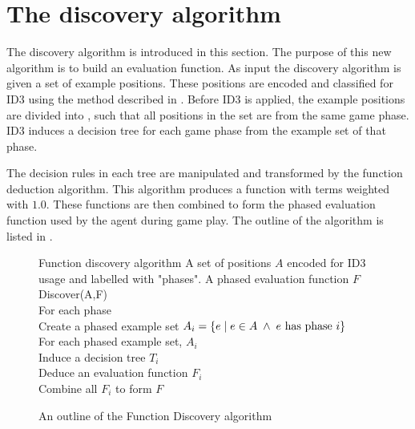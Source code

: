
\section{The discovery algorithm}
\label{sec:discovery_algorithm}
The discovery algorithm is introduced in this section.  The purpose of this new algorithm is to build an evaluation function. As input the discovery algorithm is given a set of example positions. These positions are encoded and classified for ID3 using the method described in .
Before ID3 is applied, the example positions are divided into , such that all positions in the set are from the same game phase.  ID3 induces a decision tree for each game phase from the example set of that phase.   

The decision rules in each tree are manipulated and transformed by the function deduction algorithm. This algorithm produces a function with terms weighted with $1.0$.  These functions are then combined to form the phased evaluation function used by the agent during game play.  The outline of the algorithm is listed in .  
\begin{figure}[!ht]
\begin{algorithm}
{Function discovery algorithm}
{A set of positions $A$ encoded for ID3 usage and labelled with "phases".}
{A phased evaluation function $F$} 
Discover(A,F) \+\\
For each phase \+ \\
 Create a phased example set $A_i = \{ e \; | \; e \in A \;\wedge\; e \mbox{ has phase } i \} $ \-\\
For each phased example set, $A_i$ \+ \\ 
 Induce a decision tree $T_i$ \\
 Deduce an evaluation function $F_i$\- \\
Combine all $F_i$ to form $F$ 
\end{algorithm}
\caption{An outline of the Function Discovery algorithm}
\label{alg:fd}	
\end{figure}

